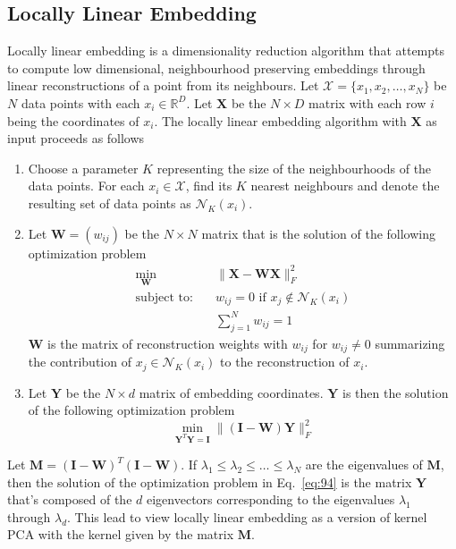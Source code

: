 \subsection{Locally Linear Embedding}
\label{sec:locally-line-embedd}
Locally linear embedding \citep{roweis00:_nonlin} is a dimensionality
reduction algorithm that attempts to compute low dimensional,
neighbourhood preserving embeddings through linear reconstructions of a
point from its neighbours. Let $\mathcal{X} = \{x_1,x_2, \dots, x_N\}$
be $N$ data points with each $x_i \in \mathbb{R}^{D}$. Let
$\mathbf{X}$ be the $N \times D$ matrix with each row $i$ being the
coordinates of $x_i$. The locally linear embedding algorithm with
$\mathbf{X}$ as input proceeds as follows
\begin{enumerate}
\item Choose a parameter $K$ representing the size of the
  neighbourhoods of the data points. For each $x_i \in \mathcal{X}$,
  find its $K$ nearest neighbours and denote the resulting set of data
  points as $\mathcal{N}_K(x_i)$.
\item Let $\mathbf{W} = (w_{ij})$ be the $N \times N$ matrix that is
  the solution of the following optimization problem
  \begin{align*}
    \min_{\mathbf{W}} & \quad \| \mathbf{X} - \mathbf{W}\mathbf{X} \|_F^{2} \\
    \text{subject to:} & \quad w_{ij} = 0 \,\, \text{if $x_j \not \in
      \mathcal{N}_K(x_i)$} \\
    & \quad \sum_{j=1}^{N}{w_{ij}} = 1
  \end{align*}
  $\mathbf{W}$ is the matrix of reconstruction weights with $w_{ij}$
  for $w_{ij} \not = 0$ summarizing the contribution of $x_j \in
  \mathcal{N}_K(x_i)$ to the reconstruction of $x_i$.
\item Let $\mathbf{Y}$ be the $N \times d$ matrix of embedding
  coordinates. $\mathbf{Y}$ is then the solution of the following
  optimization problem
  \begin{equation}
    \label{eq:94}
    \min_{\mathbf{Y}^{T}\mathbf{Y} =
      \mathbf{I}}\|(\mathbf{I} - \mathbf{W})\mathbf{Y}\|_{F}^{2}
  \end{equation}
\end{enumerate}
Let $\mathbf{M} = (\mathbf{I} - \mathbf{W})^{T}(\mathbf{I} -
\mathbf{W})$. If $\lambda_1 \leq \lambda_2 \leq \dots \leq \lambda_N$
are the eigenvalues of $\mathbf{M}$, then the solution of the
optimization problem in Eq.~\eqref{eq:94} is the matrix $\mathbf{Y}$
that's composed of the $d$ eigenvectors corresponding to the
eigenvalues $\lambda_1$ through $\lambda_{d}$. This lead \citet{ham04}
to view locally linear embedding as a version of kernel PCA
\citep{scholkopf97:_lectur_notes_comput_scien} with the kernel given
by the matrix $\mathbf{M}$.
%
%
